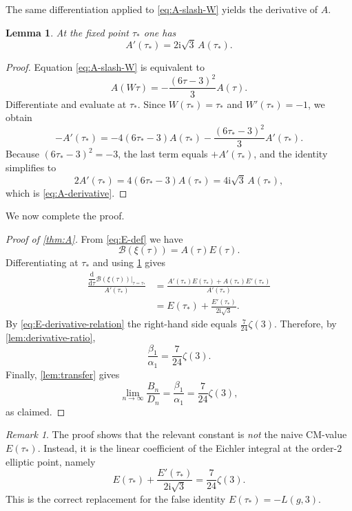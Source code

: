 \documentclass[11pt]{amsart}
\newtheorem{lemma}[theorem]{Lemma}
\theoremstyle{definition}
\theoremstyle{remark}
\newtheorem{remark}[theorem]{Remark}
\newcommand{\dd}{\mathrm{d}}
\newcommand{\ii}{\mathrm{i}}
\begin{document}
The same differentiation applied to \eqref{eq:A-slash-W} yields the derivative of $A$.

\begin{lemma}\label{lem:A-derivative}
At the fixed point $\tau_*$ one has
\begin{equation}\label{eq:A-derivative}
A'(\tau_*)=2\ii\sqrt 3\,A(\tau_*).
\end{equation}
\end{lemma}

\begin{proof}
Equation \eqref{eq:A-slash-W} is equivalent to
\[
A(W\tau)=-\frac{(6\tau-3)^2}{3}A(\tau).
\]
Differentiate and evaluate at $\tau_*$. Since $W(\tau_*)=\tau_*$ and $W'(\tau_*)=-1$, we obtain
\[
-A'(\tau_*)=-4(6\tau_*-3)A(\tau_*)-\frac{(6\tau_*-3)^2}{3}A'(\tau_*).
\]
Because $(6\tau_*-3)^2=-3$, the last term equals $+A'(\tau_*)$, and the identity simplifies to
\[
2A'(\tau_*)=4(6\tau_*-3)A(\tau_*)=4\ii\sqrt3\,A(\tau_*),
\]
which is \eqref{eq:A-derivative}.
\end{proof}

We now complete the proof.

\begin{proof}[Proof of \cref{thm:A}]
From \eqref{eq:E-def} we have
\[
\mathcal B(\xi(\tau))=A(\tau)E(\tau).
\]
Differentiating at $\tau_*$ and using \cref{lem:A-derivative} gives
\begin{align*}
\frac{\dfrac{\dd}{\dd\tau}\mathcal B(\xi(\tau))\big|_{\tau=\tau_*}}{A'(\tau_*)}
&=\frac{A'(\tau_*)E(\tau_*)+A(\tau_*)E'(\tau_*)}{A'(\tau_*)}\\
&=E(\tau_*)+\frac{E'(\tau_*)}{2\ii\sqrt 3}.
\end{align*}
By \eqref{eq:E-derivative-relation} the right-hand side equals $\frac{7}{24}\zeta(3)$. Therefore, by \cref{lem:derivative-ratio},
\[
\frac{\beta_1}{\alpha_1}=\frac{7}{24}\zeta(3).
\]
Finally, \cref{lem:transfer} gives
\[
\lim_{n\to\infty}\frac{B_n}{D_n}=\frac{\beta_1}{\alpha_1}=\frac{7}{24}\zeta(3),
\]
as claimed.
\end{proof}

\begin{remark}
The proof shows that the relevant constant is \emph{not} the naive CM-value $E(\tau_*)$. Instead, it is the linear coefficient of the Eichler integral at the order-$2$ elliptic point, namely
\[
E(\tau_*)+\frac{E'(\tau_*)}{2\ii\sqrt3}=\frac{7}{24}\zeta(3).
\]
This is the correct replacement for the false identity $E(\tau_*)=-L(g,3)$.
\end{remark}
\end{document}
